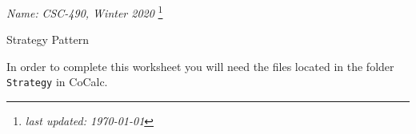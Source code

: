 \documentclass[11pt]{article}
\newlength{\up}\setlength{\up}{-\baselineskip}
\newcommand\blfootnote[1]{%
  \begingroup
  \renewcommand\thefootnote{}\footnote{#1}%
  \addtocounter{footnote}{-1}%
  \endgroup
}
\begin{document}
\noindent\emph{Name:}
\hfill
\emph{CSC-490, Winter 2020}
\blfootnote{\emph{last updated: \today}}

\begin{center}
  {\huge Strategy Pattern}
\end{center}

\medskip




In order to complete this worksheet you will need the files located in the folder \texttt{Strategy} in CoCalc.
\end{document}
